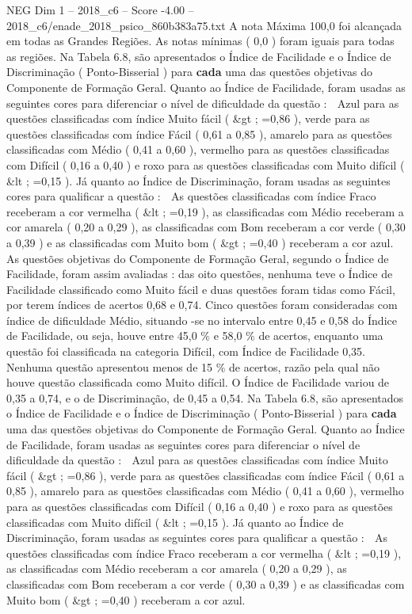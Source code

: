 \begin{textsample}{NEG Dim 1 – 2018\_c6 – Score -4.00 – 2018\_c6/enade\_2018\_psico\_860b383a75.txt}
A nota Máxima 100,0 foi alcançada em todas as Grandes Regiões.
As notas mínimas ( 0,0 ) foram iguais para todas as regiões.
Na Tabela 6.8, são apresentados o Índice de Facilidade e o Índice de Discriminação ( Ponto-Bisserial ) para \textbf{cada} uma das questões objetivas do Componente de Formação Geral.
Quanto ao Índice de Facilidade, foram usadas as seguintes cores para diferenciar o nível de dificuldade da questão :  Azul para as questões classificadas com índice Muito fácil ( \&gt ; =0,86 ), verde para as questões classificadas com índice Fácil ( 0,61 a 0,85 ), amarelo para as questões classificadas com Médio ( 0,41 a 0,60 ), vermelho para as questões classificadas com Difícil ( 0,16 a 0,40 ) e roxo para as questões classificadas com Muito difícil ( \&lt ; =0,15 ).
Já quanto ao Índice de Discriminação, foram usadas as seguintes cores para qualificar a questão :  As questões classificadas com índice Fraco receberam a cor vermelha ( \&lt ; =0,19 ), as classificadas com Médio receberam a cor amarela ( 0,20 a 0,29 ), as classificadas com Bom receberam a cor verde ( 0,30 a 0,39 ) e as classificadas com Muito bom ( \&gt ; =0,40 ) receberam a cor azul.
As questões objetivas do Componente de Formação Geral, segundo o Índice de Facilidade, foram assim avaliadas : das oito questões, nenhuma teve o Índice de Facilidade classificado como Muito fácil e duas questões foram tidas como Fácil, por terem índices de acertos 0,68 e 0,74.
Cinco questões foram consideradas com índice de dificuldade Médio, situando -se no intervalo entre 0,45 e 0,58 do Índice de Facilidade, ou seja, houve entre 45,0 \% e 58,0 \% de acertos, enquanto uma questão foi classificada na categoria Difícil, com Índice de Facilidade 0,35.
Nenhuma questão apresentou menos de 15 \% de acertos, razão pela qual não houve questão classificada como Muito difícil.
O Índice de Facilidade variou de 0,35 a 0,74, e o de Discriminação, de 0,45 a 0,54.
Na Tabela 6.8, são apresentados o Índice de Facilidade e o Índice de Discriminação ( Ponto-Bisserial ) para \textbf{cada} uma das questões objetivas do Componente de Formação Geral.
Quanto ao Índice de Facilidade, foram usadas as seguintes cores para diferenciar o nível de dificuldade da questão :  Azul para as questões classificadas com índice Muito fácil ( \&gt ; =0,86 ), verde para as questões classificadas com índice Fácil ( 0,61 a 0,85 ), amarelo para as questões classificadas com Médio ( 0,41 a 0,60 ), vermelho para as questões classificadas com Difícil ( 0,16 a 0,40 ) e roxo para as questões classificadas com Muito difícil ( \&lt ; =0,15 ).
Já quanto ao Índice de Discriminação, foram usadas as seguintes cores para qualificar a questão :  As questões classificadas com índice Fraco receberam a cor vermelha ( \&lt ; =0,19 ), as classificadas com Médio receberam a cor amarela ( 0,20 a 0,29 ), as classificadas com Bom receberam a cor verde ( 0,30 a 0,39 ) e as classificadas com Muito bom ( \&gt ; =0,40 ) receberam a cor azul.

\end{textsample}
